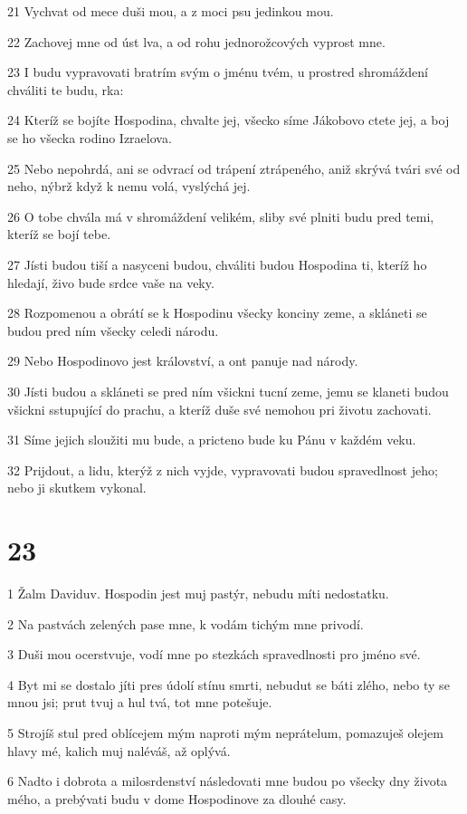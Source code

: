 \par 21 Vychvat od mece duši mou, a z moci psu jedinkou mou.
\par 22 Zachovej mne od úst lva, a od rohu jednorožcových vyprost mne.
\par 23 I budu vypravovati bratrím svým o jménu tvém, u prostred shromáždení chváliti te budu, rka:
\par 24 Kteríž se bojíte Hospodina, chvalte jej, všecko síme Jákobovo ctete jej, a boj se ho všecka rodino Izraelova.
\par 25 Nebo nepohrdá, ani se odvrací od trápení ztrápeného, aniž skrývá tvári své od neho, nýbrž když k nemu volá, vyslýchá jej.
\par 26 O tobe chvála má v shromáždení velikém, sliby své plniti budu pred temi, kteríž se bojí tebe.
\par 27 Jísti budou tiší a nasyceni budou, chváliti budou Hospodina ti, kteríž ho hledají, živo bude srdce vaše na veky.
\par 28 Rozpomenou a obrátí se k Hospodinu všecky konciny zeme, a skláneti se budou pred ním všecky celedi národu.
\par 29 Nebo Hospodinovo jest království, a ont panuje nad národy.
\par 30 Jísti budou a skláneti se pred ním všickni tucní zeme, jemu se klaneti budou všickni sstupující do prachu, a kteríž duše své nemohou pri životu zachovati.
\par 31 Síme jejich sloužiti mu bude, a pricteno bude ku Pánu v každém veku.
\par 32 Prijdout, a lidu, kterýž z nich vyjde, vypravovati budou spravedlnost jeho; nebo ji skutkem vykonal.

\chapter{23}

\par 1 Žalm Daviduv. Hospodin jest muj pastýr, nebudu míti nedostatku.
\par 2 Na pastvách zelených pase mne, k vodám tichým mne privodí.
\par 3 Duši mou ocerstvuje, vodí mne po stezkách spravedlnosti pro jméno své.
\par 4 Byt mi se dostalo jíti pres údolí stínu smrti, nebudut se báti zlého, nebo ty se mnou jsi; prut tvuj a hul tvá, tot mne potešuje.
\par 5 Strojíš stul pred oblícejem mým naproti mým neprátelum, pomazuješ olejem hlavy mé, kalich muj naléváš, až oplývá.
\par 6 Nadto i dobrota a milosrdenství následovati mne budou po všecky dny života mého, a prebývati budu v dome Hospodinove za dlouhé casy.

